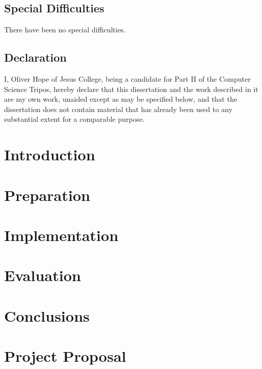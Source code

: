 \documentclass[12pt,a4paper,twoside,openright]{report}
\begin{document}
\section*{Special Difficulties}

There have been no special difficulties.
 
\newpage
\section*{Declaration}

I, Oliver Hope of Jesus College, being a candidate for Part II of the Computer
Science Tripos, hereby declare
that this dissertation and the work described in it are my own work,
unaided except as may be specified below, and that the dissertation
does not contain material that has already been used to any substantial
extent for a comparable purpose.

\bigskip
{}

\medskip
{}

\tableofcontents

\listoffigures

\newpage

\pagestyle{headings}

\chapter{Introduction}

\chapter{Preparation}

\chapter{Implementation}

\chapter{Evaluation}

\chapter{Conclusions}



\appendix

\chapter{Project Proposal}


\end{document}
